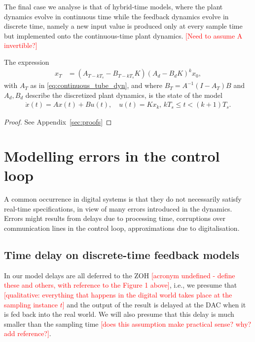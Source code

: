 \documentclass[sigconf]{llncs}
\newcommand{\mat}[1]{{#1}}
\renewcommand{\vec}[1]{{#1}}
\renewcommand{\note}[1]{\textcolor{red}{[#1]}}
\begin{document}
The final case we analyse is that of hybrid-time models, 
where the plant dynamics evolve in continuous time while the feedback dynamics evolve in discrete time, 
namely a new input value is produced only at every sample time but implemented onto the continuous-time plant dynamics. 
 \note{Need to assume A invertible?}
%
\begin{theorem}
The expression
 \begin{align}
 \vec{x}_{T} &= (\mat{A}_{T-kT_s}-\mat{B}_{T-kT_s}\mat{K}) (\mat{A}_d-\mat{B}_d\mat{K})^k\vec{x}_0, 
 \label{eq:cyber_feedback}
 \end{align}
 with $\mat{A}_T$ as in \eqref{eq:continuous_tube_dyn}, 
 and where $\mat{B}_T=\mat{A}^{-1}(\mat{I}-\mat{A}_T)\mat{B}$ and 
 $\mat{A}_d, \mat{B}_d$ describe the discretized plant dynamics, 
 is the state of the model 
 \begin{align}
 \dot{\vec{x}}(t) = \mat{A}\vec{x}(t)+\mat{B}\vec{u}(t), \quad 
 \vec{u}(t)=\mat{K}\vec{x}_k,  \,
 kT_s \leq t < (k+1)T_s. 
 \end{align}
 \end{theorem}
\begin{proof}
See Appendix~\ref{sec:proofs}
\end{proof}

\section{Modelling errors in the control loop}\label{sec:errors}

A common occurrence in digital systems is that they do not necessarily satisfy real-time specifications, 
in view of many errors introduced in the dynamics. 
Errors might results from delays due to processing time,
corruptions over communication lines in the control loop, 
approximations due to digitalisation.  

\subsection{Time delay on discrete-time feedback models} \label{sec:delay}

In our model delays are all deferred to the ZOH \note{acronym undefined - define these and others, with reference to the Figure 1 above}, 
i.e., we presume that \note{qualitative: everything that happens in the digital world takes place at
the sampling instance $t$} and the output of the result is delayed at the DAC 
when it is fed back into the real world.  
We will also presume that this delay is much smaller than the sampling time \note{does this assumption make practical sense? why? add reference?}.
\end{document}
